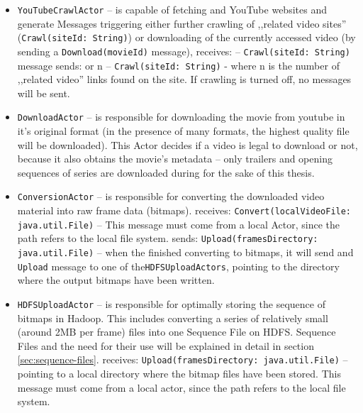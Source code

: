 \begin{itemize}
  \item \verb|YouTubeCrawlActor| -- is capable of fetching and YouTube websites and generate Messages triggering
                                    either further crawling of ,,related video sites'' (\verb|Crawl(siteId: String)|) or downloading of the 
                                    currently accessed video (by sending a \verb|Download(movieId)| message),
    \subitem receives:
       -- \verb|Crawl(siteId: String)| message
    \subitem sends:
       or n -- \verb|Crawl(siteId: String)| - where n is the number of ,,related video'' links found on the site. 
                                                           If crawling is turned off, no messages will be sent.

  \item \verb|DownloadActor| -- is responsible for downloading the movie from youtube in it's original format (in the presence of many formats, 
                                the highest quality file will be downloaded). This Actor decides if a video is legal to download or not, because it also
                                obtains the movie's metadata -- only trailers and opening sequences of series are downloaded during for the sake of this 
                                thesis.
                                
  \item \verb|ConversionActor| -- is responsible for converting the downloaded video material into raw frame data (bitmaps).
    \subitem receives:
      \subsubitem \verb|Convert(localVideoFile: java.util.File)| -- This message must come from a local Actor, since the path refers to the local file system.
    \subitem sends:
      \subsubitem \verb|Upload(framesDirectory: java.util.File)| -- when the finished converting to bitmaps, it will send and \verb|Upload| 
                                                                    message to one of the\verb|HDFSUploadActors|, pointing to the directory where the 
                                                                    output bitmaps have been written.
  \item \verb|HDFSUploadActor| -- is responsible for optimally storing the sequence of bitmaps in Hadoop. This includes converting a series of 
                                  relatively small (around 2MB per frame) files into one Sequence File on HDFS. Sequence Files and the need for their use
                                  will be explained in detail in section \ref{sec:sequence-files}.
  \subitem receives:
    \subsubitem \verb|Upload(framesDirectory: java.util.File)| -- pointing to a local directory where the bitmap files have been stored.
                                                                 This message must come from a local actor, since the path refers to the local file system.
\end{itemize}


